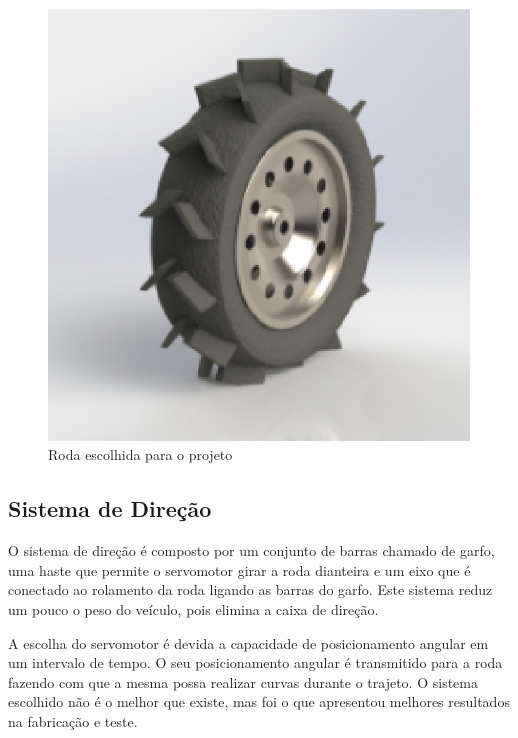   \begin{figure}[!htbp]
  \begin{center}
  \includegraphics[keepaspectratio=true,scale=0.5]{figuras/wheel.eps}
  \caption{\label{WHEEL}Roda escolhida para o projeto}
  \end{center}
  \end{figure}

  \newpage
  \vfill
  \pagebreak

  \subsection{Sistema de Direção}
    O sistema de direção é composto por um conjunto de barras chamado de garfo, uma haste que permite o servomotor girar a roda dianteira e um eixo que é conectado ao rolamento da roda ligando as barras do garfo. Este sistema reduz um pouco o peso do veículo, pois elimina a caixa de direção.
     
    A escolha do servomotor é devida a capacidade de posicionamento angular em um intervalo de tempo. O seu posicionamento angular é transmitido para a roda fazendo com que a mesma possa realizar curvas durante o trajeto. O sistema escolhido não é o melhor que existe, mas foi o que apresentou melhores resultados na fabricação e teste.
    
